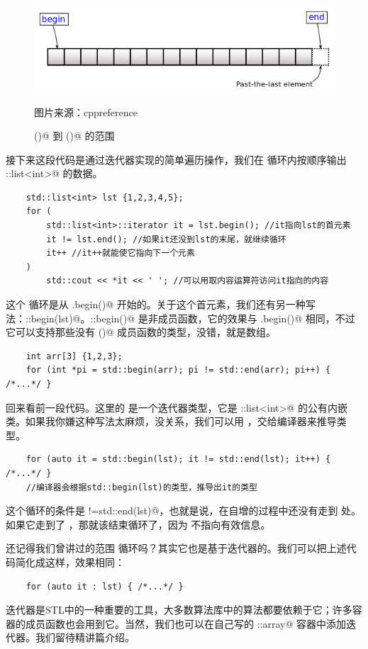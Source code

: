 \begin{figure}[htbp]
    \centering
    \includegraphics[width=.8\textwidth]{../images/generalized_parts/11_range_begin_end.png}
    \caption{\lstinline@begin()@ 到 \lstinline@end()@ 的范围}
    \footnotesize{图片来源：cppreference}
\end{figure}
接下来这段代码是通过迭代器实现的简单遍历操作，我们在 \lstinline@for@ 循环内按顺序输出 \lstinline@std::list<int>@ 的数据。\par
\begin{lstlisting}
    std::list<int> lst {1,2,3,4,5};
    for (
        std::list<int>::iterator it = lst.begin(); //it指向lst的首元素
        it != lst.end(); //如果it还没到lst的末尾，就继续循环
        it++ //it++就能使它指向下一个元素
    )
        std::cout << *it << ' '; //可以用取内容运算符访问it指向的内容
\end{lstlisting}\par
这个 \lstinline@for@ 循环是从 \lstinline@lst.begin()@ 开始的。关于这个首元素，我们还有另一种写法：\lstinline@std::begin(lst)@。\lstinline@std::begin()@ 是非成员函数，它的效果与 \lstinline@lst.begin()@ 相同，不过它可以支持那些没有 \lstinline@begin()@ 成员函数的类型，没错，就是数组。
\begin{lstlisting}
    int arr[3] {1,2,3};
    for (int *pi = std::begin(arr); pi != std::end(arr); pi++) { /*...*/ }
\end{lstlisting}\par
回来看前一段代码。这里的 \lstinline@it@ 是一个迭代器类型，它是 \lstinline@std::list<int>@ 的公有内嵌类。如果我你嫌这种写法太麻烦，没关系，我们可以用 \lstinline@auto@，交给编译器来推导类型。
\begin{lstlisting}
    for (auto it = std::begin(lst); it != std::end(lst); it++) { /*...*/ }
    //编译器会根据std::begin(lst)的类型，推导出it的类型
\end{lstlisting}
这个循环的条件是 \lstinline@it!=std::end(lst)@，也就是说，\lstinline@it@ 在自增的过程中还没有走到 \lstinline@end@ 处。如果它走到了 \lstinline@end@，那就该结束循环了，因为 \lstinline@end@ 不指向有效信息。\par
还记得我们曾讲过的范围 \lstinline@for@ 循环吗？其实它也是基于迭代器的。我们可以把上述代码简化成这样，效果相同：
\begin{lstlisting}
    for (auto it : lst) { /*...*/ }
\end{lstlisting}
迭代器是STL中的一种重要的工具，大多数算法库中的算法都要依赖于它；许多容器的成员函数也会用到它。当然，我们也可以在自己写的 \lstinline@user::array@ 容器中添加迭代器。我们留待精讲篇介绍。\par
